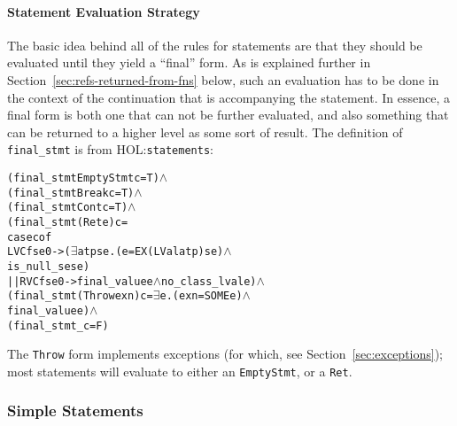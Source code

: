 \documentclass[11pt]{article}
\newcommand{\HOLfile}[1]{HOL:\texttt{#1}}
\begin{document}
\paragraph{Statement Evaluation Strategy}
The basic idea behind all of the rules for statements are that they
should be evaluated until they yield a ``final'' form.  As is
explained further in Section~\ref{sec:refs-returned-from-fns} below,
such an evaluation has to be done in the context of the continuation
that is accompanying the statement.  In essence, a final form is both
one that can not be further evaluated, and also something that can be
returned to a higher level as some sort of result.  The definition of
\texttt{final_stmt} is from \HOLfile{statements}:
\label{def:final-stmt}
%
%
\begin{alltt}
  (final_stmt EmptyStmt c = T) \(\land\)
  (final_stmt Break c = T) \(\land\)
  (final_stmt Cont c = T) \(\land\)
  (final_stmt (Ret e) c =
     case c of
        LVC f se0 -> (\(\exists\)a t p se. (e = EX (LVal a t p) se) \(\land\)
                                 is_null_se se)
     || RVC f se0 -> final_value e \(\land\) no_class_lval e) \(\land\)
  (final_stmt (Throw exn) c = \(\exists\)e. (exn = SOME e) \(\land\)
                                  final_value e) \(\land\)
  (final_stmt _ c = F)
\end{alltt}
%
%
%
The \texttt{Throw} form implements exceptions (for which, see
Section~\ref{sec:exceptions}); most statements will evaluate to either
an \texttt{EmptyStmt}, or a \texttt{Ret}.

\subsubsection{Simple Statements}
\label{sec:simple-statements}
\end{document}
